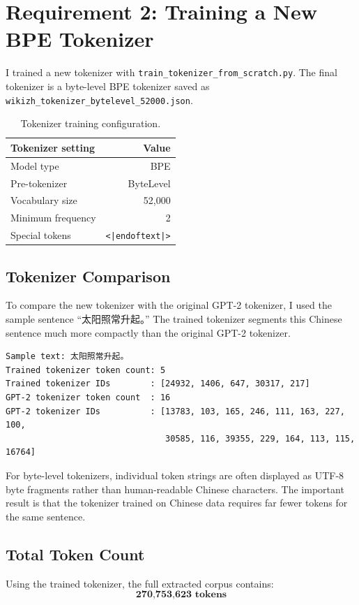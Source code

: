 \documentclass[11pt]{article}
\begin{document}
\section{Requirement 2: Training a New BPE Tokenizer}
I trained a new tokenizer with \texttt{train\_tokenizer\_from\_scratch.py}. The final tokenizer is a byte-level BPE tokenizer saved as \texttt{wikizh\_tokenizer\_bytelevel\_52000.json}.

\begin{table}[H]
\centering
\begin{tabular}{lr}
\toprule
Tokenizer setting & Value \\
\midrule
Model type & BPE \\
Pre-tokenizer & ByteLevel \\
Vocabulary size & 52,000 \\
Minimum frequency & 2 \\
Special tokens & \texttt{<|endoftext|>} \\
\bottomrule
\end{tabular}
\caption{Tokenizer training configuration.}
\end{table}

\subsection{Tokenizer Comparison}
To compare the new tokenizer with the original GPT-2 tokenizer, I used the sample sentence ``太阳照常升起。'' The trained tokenizer segments this Chinese sentence much more compactly than the original GPT-2 tokenizer.

\begin{lstlisting}
Sample text: 太阳照常升起。
Trained tokenizer token count: 5
Trained tokenizer IDs        : [24932, 1406, 647, 30317, 217]
GPT-2 tokenizer token count  : 16
GPT-2 tokenizer IDs          : [13783, 103, 165, 246, 111, 163, 227, 100,
                                30585, 116, 39355, 229, 164, 113, 115, 16764]
\end{lstlisting}

For byte-level tokenizers, individual token strings are often displayed as UTF-8 byte fragments rather than human-readable Chinese characters. The important result is that the tokenizer trained on Chinese data requires far fewer tokens for the same sentence.

\subsection{Total Token Count}
Using the trained tokenizer, the full extracted corpus contains:
\[
\textbf{270,753,623 tokens}
\]
\end{document}
